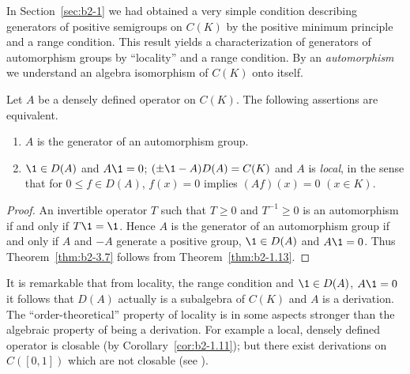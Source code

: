 In Section~\ref{sec:b2-1} we had obtained a very simple condition describing generators of positive semigroups on $C(K)$ by the positive minimum principle and a range condition.
This result yields a characterization of generators of automorphism groups by \enquote{locality} and a range condition.
By an \emph{automorphism} we understand an algebra isomorphism of\/ $C(K)$ onto itself.
\begin{theorem}\label{thm:b2-3.7}
Let $A$ be a densely defined operator on $C(K)$.
The following assertions are equivalent.
\begin{enumerate}[\upshape (a)]
\item \label{thm:b2-3.7-1}
$A$ is the generator of an automorphism group.
\item \label{thm:b2-3.7-2}
$\1 \in D(A)$ and $A\1 = 0$; $(\pm \1 - A)D(A) = C(K)$ and $A$ is \emph{local}, in the sense that for $0 \leq f \in D(A)$, $f(x) = 0$ implies $(Af)(x) = 0$ $(x \in K)$.
\end{enumerate}
\end{theorem}
\begin{proof}
An invertible operator $T$ such that $T \geq 0$ and $T^{-1} \geq 0$ is an automorphism if and only if\/ $T\1 = \1$.
Hence $A$ is the generator of an automorphism group if and only if\/ $A$ and $-A$ generate a positive group, $\1 \in D(A)$ and $A\1 = 0$.
Thus Theorem~\ref{thm:b2-3.7} follows from Theorem~\ref{thm:b2-1.13}.
\end{proof}
\begin{remark*}\label{rem:b2-3.7a}
It is remarkable that from locality, the range condition and $\1 \in D(A)$, $A\1 = 0$ it follows that $D(A)$ actually is a subalgebra of\/ $C(K)$ and $A$ is a derivation.
The \enquote{order-theoretical} property of locality is in some aspects stronger than the algebraic property of being a derivation.
For example a local, densely defined operator is closable (by Corollary~\ref{cor:b2-1.11}); but there exist derivations on $C([0,1])$ which are not closable (see \textcite{brattelirobinson:1975}).
\end{remark*}
